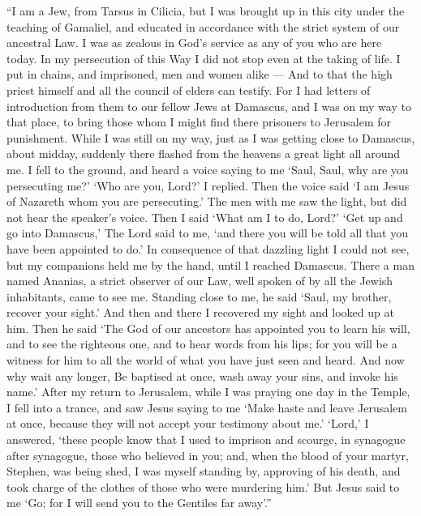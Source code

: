  ``I am a Jew, from Tarsus in Cilicia, but I was brought up
in this city under the teaching of Gamaliel, and educated in accordance
with the strict system of our ancestral Law. I was as zealous in God's
service as any of you who are here today.  In my persecution
of this Way I did not stop even at the taking of life. I put in chains,
and imprisoned, men and women alike ---  And to that the
high priest himself and all the council of elders can testify. For I had
letters of introduction from them to our fellow Jews at Damascus, and I
was on my way to that place, to bring those whom I might find there
prisoners to Jerusalem for punishment.  While I was still on
my way, just as I was getting close to Damascus, about midday, suddenly
there flashed from the heavens a great light all around me. 
I fell to the ground, and heard a voice saying to me `Saul, Saul, why
are you persecuting me?'  `Who are you, Lord?' I replied.
Then the voice said `I am Jesus of Nazareth whom you are persecuting.'
 The men with me saw the light, but did not hear the
speaker's voice.  Then I said `What am I to do, Lord?' `Get
up and go into Damascus,' The Lord said to me, `and there you will be
told all that you have been appointed to do.'  In
consequence of that dazzling light I could not see, but my companions
held me by the hand, until I reached Damascus.  There a man
named Ananias, a strict observer of our Law, well spoken of by all the
Jewish inhabitants, came to see me.  Standing close to me,
he said `Saul, my brother, recover your sight.' And then and there I
recovered my sight and looked up at him.  Then he said `The
God of our ancestors has appointed you to learn his will, and to see the
righteous one, and to hear words from his lips;  for you
will be a witness for him to all the world of what you have just seen
and heard.  And now why wait any longer, Be baptised at
once, wash away your sins, and invoke his name.'  After my
return to Jerusalem, while I was praying one day in the Temple, I fell
into a trance,  and saw Jesus saying to me `Make haste and
leave Jerusalem at once, because they will not accept your testimony
about me.'  `Lord,' I answered, `these people know that I
used to imprison and scourge, in synagogue after synagogue, those who
believed in you;  and, when the blood of your martyr,
Stephen, was being shed, I was myself standing by, approving of his
death, and took charge of the clothes of those who were murdering him.'
 But Jesus said to me `Go; for I will send you to the
Gentiles far away'.''


